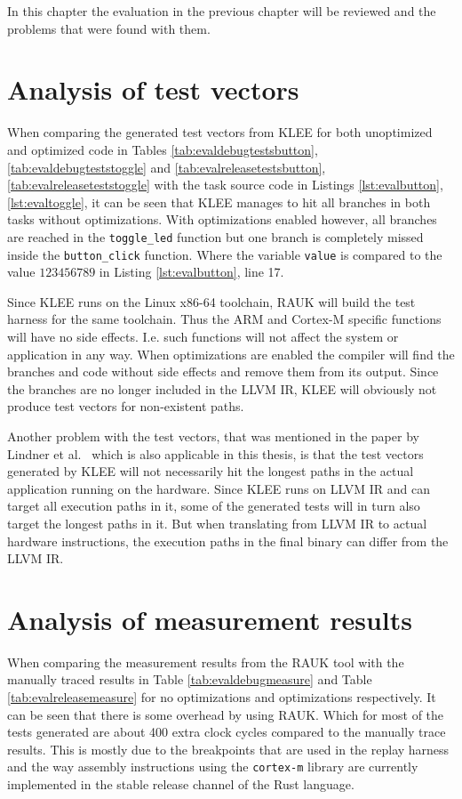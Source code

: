 In this chapter the evaluation in the previous chapter will be reviewed
and the problems that were found with them.

\section{Analysis of test vectors}
When comparing the generated test vectors from KLEE for both unoptimized and
optimized code in Tables \ref{tab:evaldebugtestsbutton},
\ref{tab:evaldebugteststoggle} and \ref{tab:evalreleasetestsbutton},
\ref{tab:evalreleaseteststoggle} with the task source code in Listings
\ref{lst:evalbutton}, \ref{lst:evaltoggle}, it can be seen that KLEE manages to
hit all branches in both tasks without optimizations. With optimizations
enabled however, all branches are reached in the \texttt{toggle\_led} function
but one branch is completely missed inside the \texttt{button\_click} function.
Where the variable \texttt{value} is compared to the value $123456789$ in
Listing \ref{lst:evalbutton}, line 17.

Since KLEE runs on the Linux x86-64 toolchain, RAUK will build the test harness
for the same toolchain. Thus the ARM and Cortex-M specific functions will have
no side effects. I.e. such functions will not affect the system or application
in any way. When optimizations are enabled the compiler will find the branches
and code without side effects and remove them from its output. Since the
branches are no longer included in the LLVM IR, KLEE will obviously not
produce test vectors for non-existent paths.

Another problem with the test vectors, that was mentioned in the paper by
Lindner et al.\ \cite{lindner} which is also applicable in this thesis, is that
the test vectors generated by KLEE will not necessarily hit the longest paths
in the actual application running on the hardware. Since KLEE runs on LLVM IR
and can target all execution paths in it, some of the generated tests will
in turn also target the longest paths in it. But when translating from LLVM
IR to actual hardware instructions, the execution paths in the final binary
can differ from the LLVM IR. 

\section{Analysis of measurement results}
When comparing the measurement results from the RAUK tool with the manually
traced results in Table \ref{tab:evaldebugmeasure} and Table
\ref{tab:evalreleasemeasure} for no optimizations and optimizations
respectively. It can be seen that there is some overhead by using RAUK. Which
for most of the tests generated are about 400 extra clock cycles compared to
the manually trace results. This is mostly due to the breakpoints that are used
in the replay harness and the way assembly instructions using the
\texttt{cortex-m} library are currently implemented in the stable release
channel of the Rust language.

